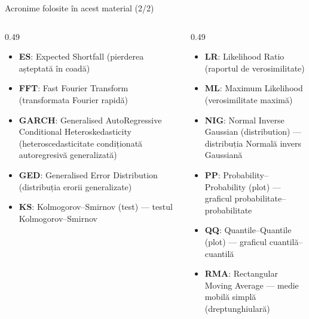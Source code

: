 \begin{frame}{Acronime folosite în acest material (2/2)}
\begin{columns}[T]
\begin{column}{0.49\textwidth}
\begin{itemize}\setlength{\itemsep}{0pt}
    \item \textbf{ES}: Expected Shortfall (pierderea așteptată în coadă)
    \item \textbf{FFT}: Fast Fourier Transform (transformata Fourier rapidă)
    \item \textbf{GARCH}: Generalised AutoRegressive Conditional Heteroskedasticity (heteroscedasticitate condiționată autoregresivă generalizată)
    \item \textbf{GED}: Generalised Error Distribution (distribuția erorii generalizate)
    \item \textbf{KS}: Kolmogorov–Smirnov (test) — testul Kolmogorov–Smirnov
\end{itemize}
\end{column}
\begin{column}{0.49\textwidth}
\begin{itemize}\setlength{\itemsep}{0pt}
    \item \textbf{LR}: Likelihood Ratio (raportul de verosimilitate)
    \item \textbf{ML}: Maximum Likelihood (verosimilitate maximă)
    \item \textbf{NIG}: Normal Inverse Gaussian (distribution) — distribuția Normală invers Gaussiană
    \item \textbf{PP}: Probability–Probability (plot) — graficul probabilitate–probabilitate
    \item \textbf{QQ}: Quantile–Quantile (plot) — graficul cuantilă–cuantilă
    \item \textbf{RMA}: Rectangular Moving Average — medie mobilă simplă (dreptunghiulară)
\end{itemize}
\end{column}
\end{columns}
\end{frame}

